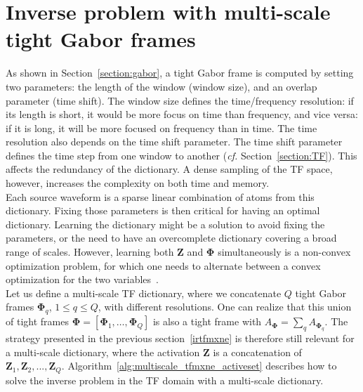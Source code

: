 \section{Inverse problem with multi-scale tight Gabor frames}
As shown in Section~\ref{section:gabor}, a tight Gabor frame is computed by setting two parameters: the length of the window (window size), and an overlap parameter (time shift). The window size defines the time/frequency resolution: if its length is short, it would be more focus on time than frequency, and vice versa: if it is long, it will be more focused on frequency than in time. The time resolution also depends on the time shift parameter. The time shift parameter defines the time step from one window to another (\textit{cf.} Section~\ref{section:TF}). This affects the redundancy of the dictionary. A dense sampling of the TF space, however, increases the complexity on both time and memory.\\

Each source waveform is a sparse linear combination of atoms from this dictionary. Fixing those parameters is then critical for having an optimal dictionary. %
Learning the dictionary might be a solution to avoid fixing the parameters, or the need to have an overcomplete dictionary covering a broad range of scales. However, learning both $\mathbf{Z}$ and $\mathbf{\Phi}$ simultaneously is a non-convex optimization problem, for which one needs to alternate between a convex optimization for the two variables~\cite{montoya2014regularized}. \\


Let us define a multi-scale TF dictionary, where we concatenate $Q$ tight Gabor frames $\mathbf{\Phi}_q$, $ 1 \leq q \leq Q$, with different resolutions. One can realize that this union of tight frames $\mathbf{\Phi} = [\mathbf{\Phi}_1, \dots, \mathbf{\Phi}_Q]$ is also a tight frame with $A_\mathbf{\Phi} = \sum_q A_{\mathbf{\Phi}_q}$. The strategy presented in the previous section~\ref{irtfmxne} is therefore still relevant for a multi-scale dictionary, where the activation $\mathbf{Z}$ is a concatenation of $\mathbf{Z}_1, \mathbf{Z}_2, ..., \mathbf{Z}_Q$. Algorithm~\ref{alg:multiscale_tfmxne_activeset} describes how to solve the inverse problem in the TF domain with a multi-scale dictionary.

